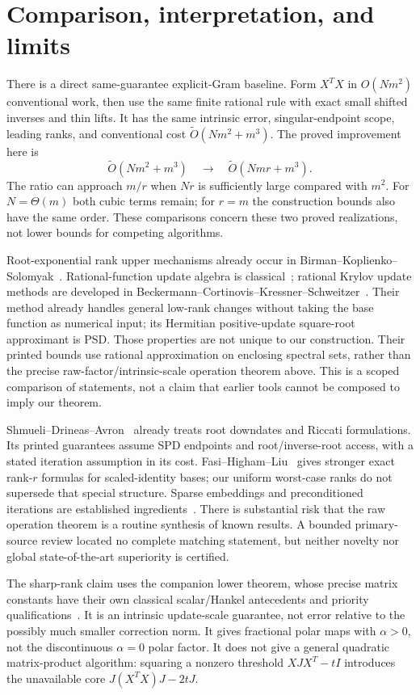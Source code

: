 \documentclass[11pt]{article}
\numberwithin{equation}{section}
\begin{document}
\section{Comparison, interpretation, and limits}

There is a direct same-guarantee explicit-Gram baseline. Form $X^TX$
in $O(Nm^2)$ conventional work, then use the same finite rational rule
with exact small shifted inverses and thin lifts. It has the same
intrinsic error, singular-endpoint scope, leading ranks, and conventional
cost $\widetilde O(Nm^2+m^3)$. The proved improvement here is
\[
 \widetilde O(Nm^2+m^3)\quad\longrightarrow\quad
 \widetilde O(Nmr+m^3).
\]
The ratio can approach $m/r$ when $Nr$ is sufficiently large compared
with $m^2$. For $N=\Theta(m)$ both cubic terms remain; for $r=m$ the
construction bounds also have the same order. These comparisons concern
these two proved realizations, not lower bounds for competing algorithms.

Root-exponential rank upper mechanisms already occur in
Birman--Koplienko--Solomyak~\cite{BKS}. Rational-function update algebra
is classical~\cite{BV}; rational Krylov update methods are developed
in Beckermann--Cortinovis--Kressner--Schweitzer~\cite{BCKS}. Their method
already handles general low-rank changes without taking the base
function as numerical input; its Hermitian positive-update square-root
approximant is PSD. Those properties are not unique to our construction.
Their printed bounds use rational approximation on enclosing spectral
sets, rather than the precise raw-factor/intrinsic-scale operation theorem
above. This is a scoped comparison of statements, not a claim that
earlier tools cannot be composed to imply our theorem.

Shmueli--Drineas--Avron~\cite{SDA} already treats root downdates and
Riccati formulations. Its printed guarantees assume SPD endpoints and
root/inverse-root access, with a stated iteration assumption in its cost.
Fasi--Higham--Liu~\cite{FHL} gives stronger exact rank-$r$ formulas for
scaled-identity bases; our uniform worst-case ranks do not supersede
that special structure. Sparse embeddings and preconditioned iterations
are established ingredients~\cite{NN}. There is substantial risk that
the raw operation theorem is a routine synthesis of known results.
A bounded primary-source review located no complete matching statement,
but neither novelty nor global state-of-the-art superiority is certified.

The sharp-rank claim uses the companion lower theorem, whose precise
matrix constants have their own classical scalar/Hankel antecedents
and priority qualifications~\cite{Sharp,Extensions}. It is an intrinsic
update-scale guarantee, not error relative to the possibly much smaller
correction norm. It gives fractional polar maps with $\alpha>0$,
not the discontinuous $\alpha=0$ polar factor. It does not give a
general quadratic matrix-product algorithm: squaring a nonzero threshold
$XJX^T-tI$ introduces the unavailable core $J(X^TX)J-2tJ$.
\end{document}
